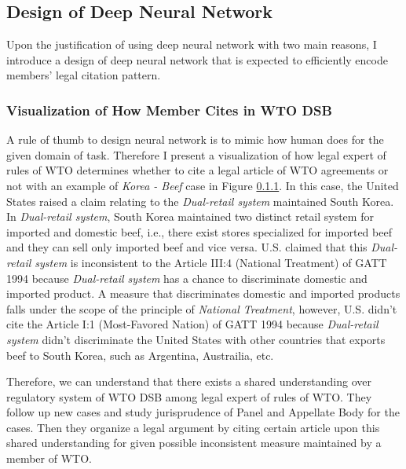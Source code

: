 \documentclass[12pt,letterpaper]{article}
\begin{document}
\subsection{Design of Deep Neural Network}
Upon the justification of using deep neural network with two main reasons, %
I introduce a design of deep neural network that is expected to efficiently encode members' legal citation pattern.

\subsubsection{Visualization of How Member Cites in WTO DSB}
A rule of thumb to design neural network is to mimic 
how human does for the given domain of task. 
Therefore I present a visualization of how legal expert of rules of WTO determines whether to cite a legal article of WTO agreements or not with an example of \textit{Korea - Beef} case in Figure \ref{}.
In this case, the United States raised a claim relating to the \textit{Dual-retail system} maintained South Korea. In \textit{Dual-retail system}, South Korea maintained two distinct retail system
for imported and domestic beef, i.e., there exist stores specialized for imported beef and they can sell only imported beef and vice versa. U.S. claimed that this \textit{Dual-retail system} is inconsistent to the Article III:4 (National Treatment) of GATT 1994 
because \textit{Dual-retail system} has a chance to discriminate domestic and imported product. A measure that discriminates domestic and imported products falls under the scope of the principle of \textit{National Treatment}, however, U.S. didn't 
cite the Article I:1 (Most-Favored Nation) of GATT 1994 
because \textit{Dual-retail system} didn't discriminate the United States with other countries that exports beef to South Korea, such as Argentina, Austrailia, etc.

Therefore, we can understand that there exists a shared understanding over regulatory system of WTO DSB among legal expert of rules of WTO. They follow up new cases and study jurisprudence of Panel and Appellate Body for the cases.
Then they organize a legal argument by citing certain article upon this shared understanding for given possible inconsistent measure maintained by a member of WTO.
\end{document}
